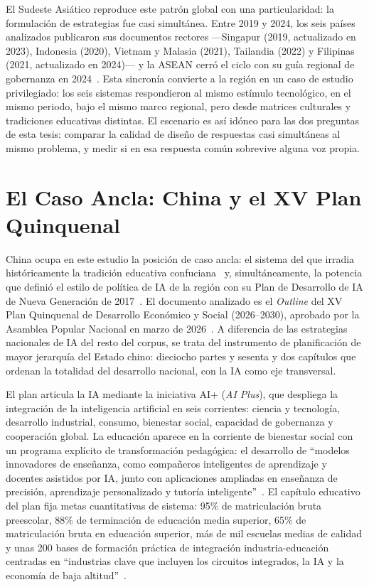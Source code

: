 El Sudeste Asiático reproduce este patrón global con una particularidad: la formulación de estrategias fue casi simultánea. Entre 2019 y 2024, los seis países analizados publicaron sus documentos rectores —Singapur (2019, actualizado en 2023), Indonesia (2020), Vietnam y Malasia (2021), Tailandia (2022) y Filipinas (2021, actualizado en 2024)— y la ASEAN cerró el ciclo con su guía regional de gobernanza en 2024~\citep{asean2024guide}. Esta sincronía convierte a la región en un caso de estudio privilegiado: los seis sistemas respondieron al mismo estímulo tecnológico, en el mismo periodo, bajo el mismo marco regional, pero desde matrices culturales y tradiciones educativas distintas. El escenario es así idóneo para las dos preguntas de esta tesis: comparar la calidad de diseño de respuestas casi simultáneas al mismo problema, y medir si en esa respuesta común sobrevive alguna voz propia.


\section{El Caso Ancla: China y el XV Plan Quinquenal}
\label{sec:china}

China ocupa en este estudio la posición de caso ancla: el sistema del que irradia históricamente la tradición educativa confuciana~\citep{suen2006chronic, marginson2011higher} y, simultáneamente, la potencia que definió el estilo de política de IA de la región con su Plan de Desarrollo de IA de Nueva Generación de 2017~\citep{china2017ai, knox2020artificial}. El documento analizado es el \textit{Outline} del XV Plan Quinquenal de Desarrollo Económico y Social (2026--2030), aprobado por la Asamblea Popular Nacional en marzo de 2026~\citep{china2026fyp}. A diferencia de las estrategias nacionales de IA del resto del corpus, se trata del instrumento de planificación de mayor jerarquía del Estado chino: dieciocho partes y sesenta y dos capítulos que ordenan la totalidad del desarrollo nacional, con la IA como eje transversal.

El plan articula la IA mediante la iniciativa AI+ (\textit{AI Plus}), que despliega la integración de la inteligencia artificial en seis corrientes: ciencia y tecnología, desarrollo industrial, consumo, bienestar social, capacidad de gobernanza y cooperación global. La educación aparece en la corriente de bienestar social con un programa explícito de transformación pedagógica: el desarrollo de ``modelos innovadores de enseñanza, como compañeros inteligentes de aprendizaje y docentes asistidos por IA, junto con aplicaciones ampliadas en enseñanza de precisión, aprendizaje personalizado y tutoría inteligente''~\citep{china2026fyp}. El capítulo educativo del plan fija metas cuantitativas de sistema: 95\% de matriculación bruta preescolar, 88\% de terminación de educación media superior, 65\% de matriculación bruta en educación superior, más de mil escuelas medias de calidad y unas 200 bases de formación práctica de integración industria-educación centradas en ``industrias clave que incluyen los circuitos integrados, la IA y la economía de baja altitud''~\citep{china2026fyp}.

